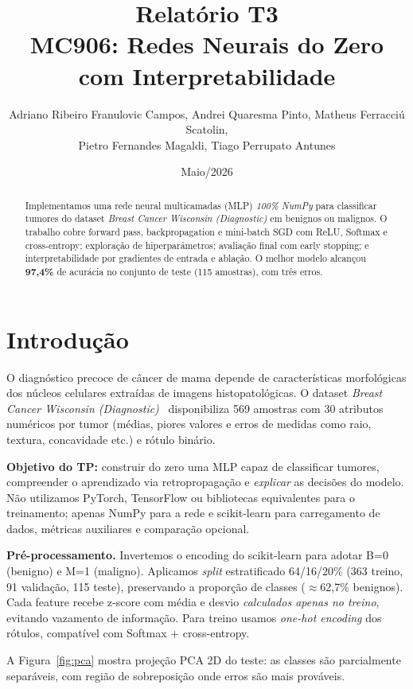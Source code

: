 \documentclass[a4paper,11pt]{article}
\title{\textbf{Relatório T3} \\ \large MC906: Redes Neurais do Zero com Interpretabilidade}
\author{
    Adriano Ribeiro Franulovic Campos,
    Andrei Quaresma Pinto,
    Matheus Ferracciú Scatolin,\\
    Pietro Fernandes Magaldi,
    Tiago Perrupato Antunes\\
}
\date{Maio/2026}
\begin{document}
\maketitle

\begin{abstract}
Implementamos uma rede neural multicamadas (MLP) \emph{100\% NumPy} para classificar tumores do dataset \emph{Breast Cancer Wisconsin (Diagnostic)} em benignos ou malignos. O trabalho cobre forward pass, backpropagation e mini-batch SGD com ReLU, Softmax e cross-entropy; exploração de hiperparâmetros; avaliação final com early stopping; e interpretabilidade por gradientes de entrada e ablação. O melhor modelo alcançou \textbf{97,4\%} de acurácia no conjunto de teste (115 amostras), com três erros.
\end{abstract}

\section{Introdução}

O diagnóstico precoce de câncer de mama depende de características morfológicas dos núcleos celulares extraídas de imagens histopatológicas. O dataset \emph{Breast Cancer Wisconsin (Diagnostic)}~\cite{sklearn-bc} disponibiliza 569 amostras com 30 atributos numéricos por tumor (médias, piores valores e erros de medidas como raio, textura, concavidade etc.) e rótulo binário.

\textbf{Objetivo do TP:} construir do zero uma MLP capaz de classificar tumores, compreender o aprendizado via retropropagação e \emph{explicar} as decisões do modelo. Não utilizamos PyTorch, TensorFlow ou bibliotecas equivalentes para o treinamento; apenas NumPy para a rede e scikit-learn para carregamento de dados, métricas auxiliares e comparação opcional.

\textbf{Pré-processamento.} Invertemos o encoding do scikit-learn para adotar B=0 (benigno) e M=1 (maligno). Aplicamos \emph{split} estratificado 64/16/20\% (363 treino, 91 validação, 115 teste), preservando a proporção de classes ($\approx$62,7\% benignos). Cada feature recebe z-score com média e desvio \emph{calculados apenas no treino}, evitando vazamento de informação. Para treino usamos \emph{one-hot encoding} dos rótulos, compatível com Softmax + cross-entropy.

A Figura~\ref{fig:pca} mostra projeção PCA 2D do teste: as classes são parcialmente separáveis, com região de sobreposição onde erros são mais prováveis.
\end{document}
